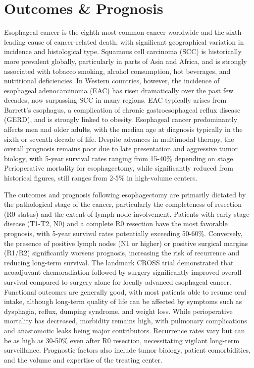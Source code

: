 \section*{Outcomes \& Prognosis}
Esophageal cancer is the eighth most common cancer worldwide and the sixth leading cause of cancer-related death, with significant geographical variation in incidence and histological type. Squamous cell carcinoma (SCC) is historically more prevalent globally, particularly in parts of Asia and Africa, and is strongly associated with tobacco smoking, alcohol consumption, hot beverages, and nutritional deficiencies. In Western countries, however, the incidence of esophageal adenocarcinoma (EAC) has risen dramatically over the past few decades, now surpassing SCC in many regions. EAC typically arises from Barrett's esophagus, a complication of chronic gastroesophageal reflux disease (GERD), and is strongly linked to obesity. Esophageal cancer predominantly affects men and older adults, with the median age at diagnosis typically in the sixth or seventh decade of life. Despite advances in multimodal therapy, the overall prognosis remains poor due to late presentation and aggressive tumor biology, with 5-year survival rates ranging from 15-40\% depending on stage. Perioperative mortality for esophagectomy, while significantly reduced from historical figures, still ranges from 2-5\% in high-volume centers.

The outcomes and prognosis following esophagectomy are primarily dictated by the pathological stage of the cancer, particularly the completeness of resection (R0 status) and the extent of lymph node involvement. Patients with early-stage disease (T1-T2, N0) and a complete R0 resection have the most favorable prognosis, with 5-year survival rates potentially exceeding 50-60\%. Conversely, the presence of positive lymph nodes (N1 or higher) or positive surgical margins (R1/R2) significantly worsens prognosis, increasing the risk of recurrence and reducing long-term survival. The landmark CROSS trial demonstrated that neoadjuvant chemoradiation followed by surgery significantly improved overall survival compared to surgery alone for locally advanced esophageal cancer. Functional outcomes are generally good, with most patients able to resume oral intake, although long-term quality of life can be affected by symptoms such as dysphagia, reflux, dumping syndrome, and weight loss. While perioperative mortality has decreased, morbidity remains high, with pulmonary complications and anastomotic leaks being major contributors. Recurrence rates vary but can be as high as 30-50\% even after R0 resection, necessitating vigilant long-term surveillance. Prognostic factors also include tumor biology, patient comorbidities, and the volume and expertise of the treating center.

